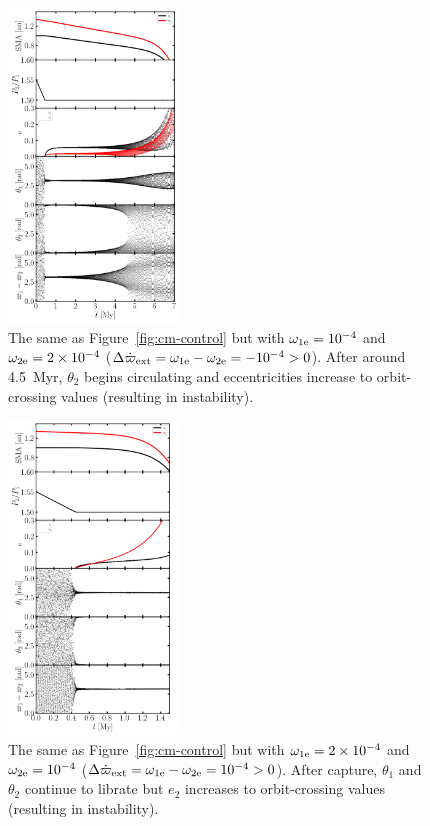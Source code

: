 \documentclass[usenatbib,twocolumn]{mnras}
\begin{document}
\begin{figure}
    \includegraphics[width=0.4\textwidth]{cm_1e-4_2e-4.png}
    \caption{The same as Figure~\ref{fig:cm-control} but with $\omega_{1\rm e}=10^{-4}$ and $\omega_{2\rm e}=2\times10^{-4}$ ($\Delta\dot\varpi_{\rm ext}=\omega_{1\rm e}-\omega_{2\rm e}=-10^{-4}>0$). After around 4.5~Myr, $\theta_2$ begins circulating and eccentricities increase to orbit-crossing values (resulting in instability).}
    \label{fig:cm-neg-dDpom}
\end{figure}

\begin{figure}
    \includegraphics[width=0.4\textwidth]{cm_2e-4_1e-4.png}
    \caption{The same as Figure~\ref{fig:cm-control} but with $\omega_{1\rm e}=2\times10^{-4}$ and $\omega_{2\rm e}=10^{-4}$ ($\Delta\dot\varpi_{\rm ext}=\omega_{1\rm e}-\omega_{2\rm e}=10^{-4}>0$). After capture, $\theta_1$ and $\theta_2$ continue to librate but $e_2$ increases to orbit-crossing values (resulting in instability).
    }
    \label{fig:cm-pos-dDpom}
\end{figure}
\end{document}
